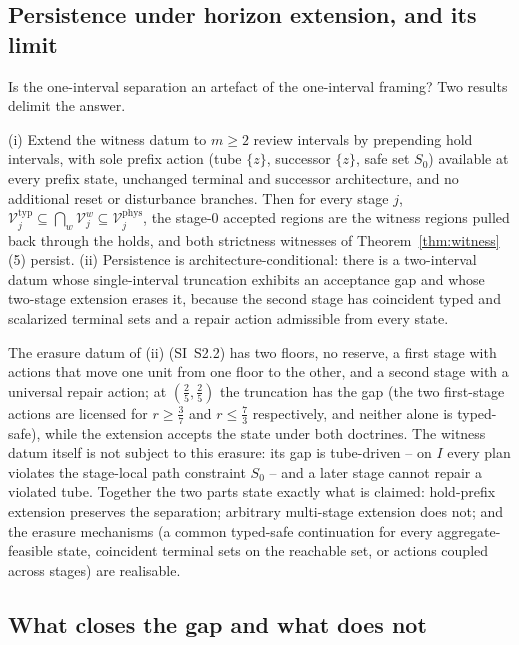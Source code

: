 \subsection{Persistence under horizon extension, and its limit}\label{sec:persist}

Is the one-interval separation an artefact of the one-interval framing? Two results delimit the answer.

\begin{proposition}\label{prop:persist}
\textup{(i)} Extend the witness datum to $m\ge2$ review intervals by prepending hold intervals, with sole prefix action  (tube $\{z\}$, successor $\{z\}$, safe set $S_0$) available at every prefix state, unchanged terminal and successor architecture, and no additional reset or disturbance branches. Then for every stage $j$, $\mathcal V^{\mathrm{typ}}_j\subseteq\bigcap_{w}\mathcal V^{w}_j\subseteq\mathcal V^{\mathrm{phys}}_j$, the stage-0 accepted regions are the witness regions pulled back through the holds, and both strictness witnesses of Theorem~\ref{thm:witness}(5) persist.
\textup{(ii)} Persistence is architecture-conditional: there is a two-interval datum whose single-interval truncation exhibits an acceptance gap and whose two-stage extension erases it, because the second stage has coincident typed and scalarized terminal sets and a repair action admissible from every state.
\end{proposition}

The erasure datum of (ii) (SI~S2.2) has two floors, no reserve, a first stage with actions that move one unit from one floor to the other, and a second stage with a universal repair action; at $(\tfrac25,\tfrac25)$ the truncation has the gap (the two first-stage actions are licensed for $r\ge\tfrac37$ and $r\le\tfrac73$ respectively, and neither alone is typed-safe), while the extension accepts the state under both doctrines. The witness datum itself is not subject to this erasure: its gap is tube-driven -- on $I$ every plan violates the stage-local path constraint $S_0$ -- and a later stage cannot repair a violated tube. Together the two parts state exactly what is claimed: hold-prefix extension preserves the separation; arbitrary multi-stage extension does not; and the erasure mechanisms (a common typed-safe continuation for every aggregate-feasible state, coincident terminal sets on the reachable set, or actions coupled across stages) are realisable.

\subsection{What closes the gap and what does not}\label{sec:closing}

